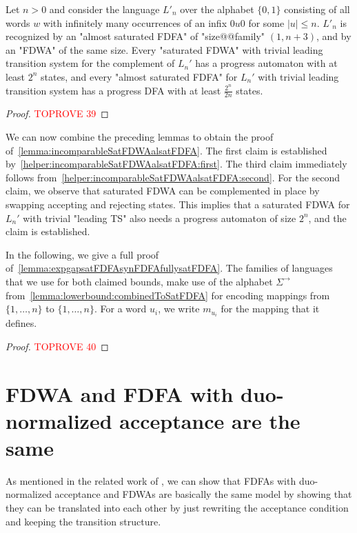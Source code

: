 \documentclass[a4paper,USenglish,cleveref,autoref,thm-restate]{lipics-v2021}
\begin{document}
{\begin{lemma}
    Let $n > 0$ and consider the language $L'_n$ over the alphabet $\{0,1\}$ consisting of all words $w$ with infinitely many occurrences of an infix $0u0$ for some $|u| \leq n$.
    $L'_n$ is recognized by an "almost saturated FDFA" of "size@@family" $(1,n+3)$, and by an "FDWA" of the same size.
    Every "saturated FDWA" with trivial leading transition system for the complement of $L_n'$ has a progress automaton with at least $2^n$ states, and every "almost saturated FDFA" for $L_n'$ with trivial leading transition system has a progress DFA with at least $\frac{2^n}{2n}$ states.
    \label{helper:incomparableSatFDWAalsatFDFA:second}
\end{lemma}
\begin{proof}\textcolor{red}{TOPROVE 39}\end{proof}

We can now combine the preceding lemmas to obtain the proof of~\cref{lemma:incomparableSatFDWAalsatFDFA}.
The first claim is established by~\cref{helper:incomparableSatFDWAalsatFDFA:first}.
The third claim immediately follows from~\cref{helper:incomparableSatFDWAalsatFDFA:second}.
For the second claim, we observe that saturated FDWA can be complemented in place by swapping accepting and rejecting states.
This implies that a saturated FDWA for $L_n'$ with trivial "leading TS" also needs a progress automaton of size $2^n$, and the claim is established.

In the following, we give a full proof of~\cref{lemma:expgapsatFDFAsynFDFAfullysatFDFA}.
The families of languages that we use for both claimed bounds, make use of the alphabet $\Sigma^\to$ from~\cref{lemma:lowerbound:combinedToSatFDFA} for encoding mappings from $\{1,\dots,n\}$ to $\{1,\dots,n\}$.
For a word $u_i$, we write $m_{u_i}$ for the mapping that it defines.

\expgapsatFDFAsynFDFAfullysatFDFA*
\begin{proof}\textcolor{red}{TOPROVE 40}\end{proof} 
\section{FDWA and FDFA with duo-normalized acceptance are the same}\label{section:appendix-duo-normal}
As mentioned in the related work of , we can show that FDFAs with duo-normalized acceptance and FDWAs are basically the same model by showing that they can be translated into each other by just rewriting the acceptance condition and keeping the transition structure.

}
\end{document}
